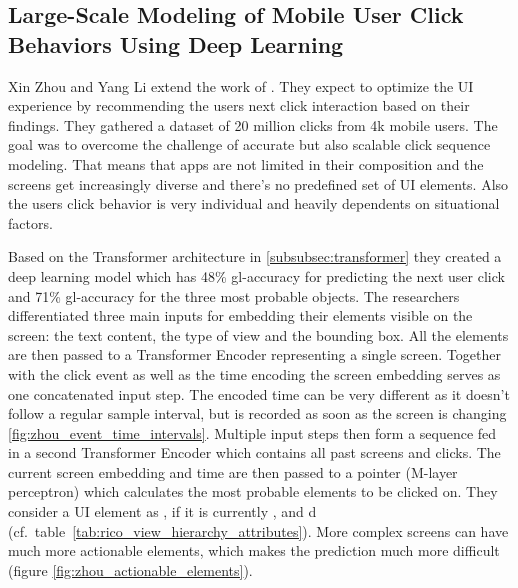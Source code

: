 
\subsection{Large-Scale Modeling of Mobile User Click Behaviors Using Deep Learning}
\label{subsec:user-click-behaviors-deep-learning}

Xin Zhou and Yang Li \cite{zhou2021large} extend the work of \cite{lee2018click}.
They expect to optimize the UI experience by recommending the users next click interaction based on their findings.
They gathered a dataset of 20 million clicks from 4k mobile users.
The goal was to overcome the challenge of accurate but also scalable click sequence modeling.
That means that apps are not limited in their composition and the screens get increasingly diverse and there's no predefined set of UI elements.
Also the users click behavior is very individual and heavily dependents on situational factors.

Based on the Transformer architecture in \ref{subsubsec:transformer} they created a deep learning model which has 48\% \gls{gl-accuracy} for predicting the next user click and 71\% \gls{gl-accuracy} for the three most probable  objects.
The researchers differentiated three main inputs for embedding their elements visible on the screen: the text content, the type of view and the bounding box.
All the elements are then passed to a Transformer Encoder representing a single screen.
Together with the click event as well as the time encoding the screen embedding serves as one concatenated input step.
The encoded time can be very different as it doesn't follow a regular sample interval, but is recorded as soon as the screen is changing \ref{fig:zhou_event_time_intervals}.
Multiple input steps then form a sequence fed in a second Transformer Encoder which contains all past screens and clicks.
The current screen embedding and time are then passed to a pointer (M-layer perceptron) which calculates the most probable  elements to be clicked on.
They consider a UI element as , if it is currently ,  and d (cf.\ table~\ref{tab:rico_view_hierarchy_attributes}).
More complex screens can have much more actionable elements, which makes the prediction much more difficult (figure \ref{fig:zhou_actionable_elements}).

